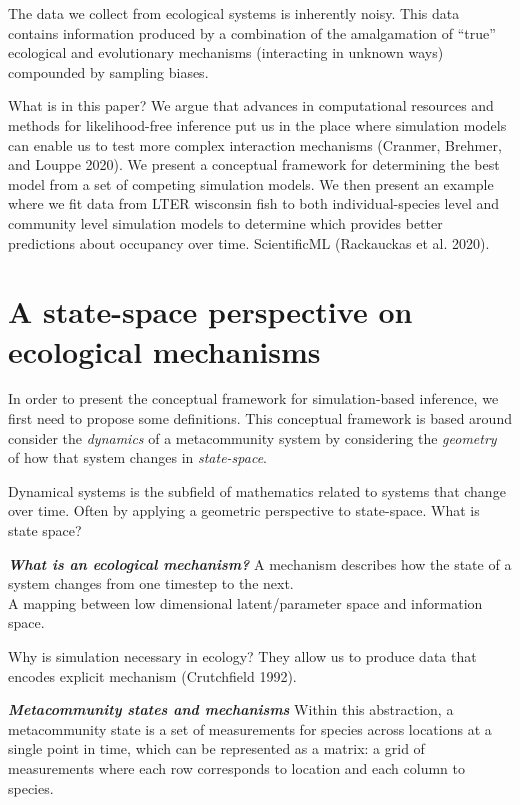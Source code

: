 \documentclass[11pt]{article}
\begin{document}
The data we collect from ecological systems is inherently noisy. This
data contains information produced by a combination of the amalgamation
of ``true'' ecological and evolutionary mechanisms (interacting in
unknown ways) compounded by sampling biases.

What is in this paper? We argue that advances in computational resources
and methods for likelihood-free inference put us in the place where
simulation models can enable us to test more complex interaction
mechanisms (Cranmer, Brehmer, and Louppe 2020). We present a conceptual
framework for determining the best model from a set of competing
simulation models. We then present an example where we fit data from
LTER wisconsin fish to both individual-species level and community level
simulation models to determine which provides better predictions about
occupancy over time. ScientificML (Rackauckas et al. 2020).

\hypertarget{a-state-space-perspective-on-ecological-mechanisms}{%
\section{A state-space perspective on ecological
mechanisms}\label{a-state-space-perspective-on-ecological-mechanisms}}

In order to present the conceptual framework for simulation-based
inference, we first need to propose some definitions. This conceptual
framework is based around consider the \emph{dynamics} of a
metacommunity system by considering the \emph{geometry} of how that
system changes in \emph{state-space}.

Dynamical systems is the subfield of mathematics related to systems that
change over time. Often by applying a geometric perspective to
state-space. What is state space?

\textbf{\emph{What is an ecological mechanism?}} A mechanism describes
how the state of a system changes from one timestep to the next.\\
A mapping between low dimensional latent/parameter space and information
space.

Why is simulation necessary in ecology? They allow us to produce data
that encodes explicit mechanism (Crutchfield 1992).

\textbf{\emph{Metacommunity states and mechanisms}} Within this
abstraction, a metacommunity state is a set of measurements for species
across locations at a single point in time, which can be represented as
a matrix: a grid of measurements where each row corresponds to location
and each column to species.
\end{document}
